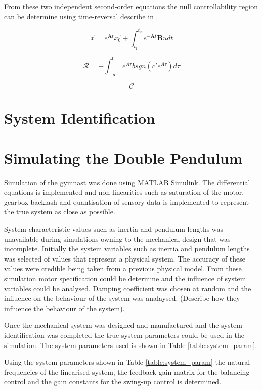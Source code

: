 \documentclass[a4paper,12pt]{article}
\begin{document}
	From these two independent second-order equations the null controllability region can be determine using time-reversal describe in \cite{null_controllability}.
	
	$$ \vec{x} = e^{\boldsymbol{A}t}\vec{x_{0}} + \int_{t_{1}}^{t_{2}} e^{-\boldsymbol{A}t}\boldsymbol{B}u dt $$ 
	
	$$\mathcal{R} = {-\int_{-\infty}^{0} e^{A\tau}bsgn(c'e^{A\tau})d\tau }  $$
	
	$$\mathcal{C} $$ 
	
	
	\section{System Identification}
	
	
	
	\section{Simulating the Double Pendulum}
	
	Simulation of the gymnast was done using MATLAB Simulink. The differential equations is implemented and non-linearities such as saturation of the motor, gearbox backlash and quantisation of sensory data is implemented to represent the true system as close as possible.
	
	System characteristic values such as inertia and pendulum lengths was unavailable during simulations owning to the mechanical design that was incomplete. Initially the system variables such as inertia and pendulum lengths was selected of values that represent a physical system. The accuracy of these values were credible being taken from a previous physical model. From these simulation motor specification could be determine and the influence of system variables could be analysed. Damping coefficient was chosen at random and the influence on the behaviour of the system was analaysed. (Describe how they influence the behaviour of the system).
	
	Once the mechanical system was designed and manufactured and the system identification was completed the true system parameters could be used in the simulation. The system parameters used is shown in Table \ref{table:system_param}.
	
	Using the system parameters shown in Table \ref{table:system_param} the natural frequencies of the linearised system, the feedback gain matrix for the balancing control and the gain constants for the swing-up control is determined.
	
\end{document}
